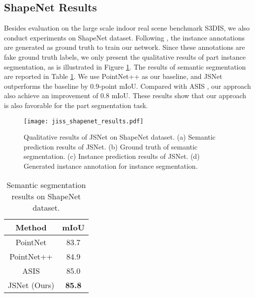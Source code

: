 \documentclass[letterpaper]{article} \usepackage{aaai20}  \usepackage{times}  \usepackage{helvet} \usepackage{courier}  \usepackage[hyphens]{url}  \usepackage{graphicx} \urlstyle{rm} \def\UrlFont{\rm}  \usepackage{graphicx}  \frenchspacing  \setlength{\pdfpagewidth}{8.5in}  \setlength{\pdfpageheight}{11in}
\begin{document}
\subsection{ShapeNet Results}
Besides evaluation on the large scale indoor real scene benchmark S3DIS, we also conduct experiments on ShapeNet dataset. Following \cite{Wang_2018_CVPR}, the instance annotations are generated as ground truth to train our network. Since these annotations are fake ground truth labels, we only present the qualitative results of part instance segmentation, as is illustrated in Figure \ref{fig:shapenet_results}. The results of semantic segmentation are reported in Table \ref{tab:shapenet_sem}. We use PointNet++ \cite{qi2017pointnet++} as our baseline, and JSNet outperforms the baseline by 0.9-point mIoU. Compared with ASIS \cite{Wang_2019_CVPR}, our approach also achieve an improvement of 0.8 mIoU. These results show that our approach is also favorable for the part segmentation task.

\begin{figure}[t]
	\centering
	\texttt{[image: jiss\_shapenet\_results.pdf]}
	\caption{Qualitative results of JSNet on ShapeNet dataset. (a) Semantic prediction results of JSNet. (b) Ground truth of semantic segmentation. (c) Instance prediction results of JSNet. (d) Generated instance annotation for instance segmentation.}
	\label{fig:shapenet_results}
\end{figure}

\begin{table}[t]
	\caption{Semantic segmentation results on ShapeNet dataset.}
	\smallskip
	\centering
\begin{tabular}{c|c}
		\hline
		Method         & mIoU  \\
		\hline
		PointNet       & 83.7  \\
		PointNet++     & 84.9  \\
		ASIS           & 85.0  \\
		JSNet (Ours)   & \textbf{85.8} \\
		\hline
	\end{tabular}
\label{tab:shapenet_sem}
\end{table}
\end{document}
